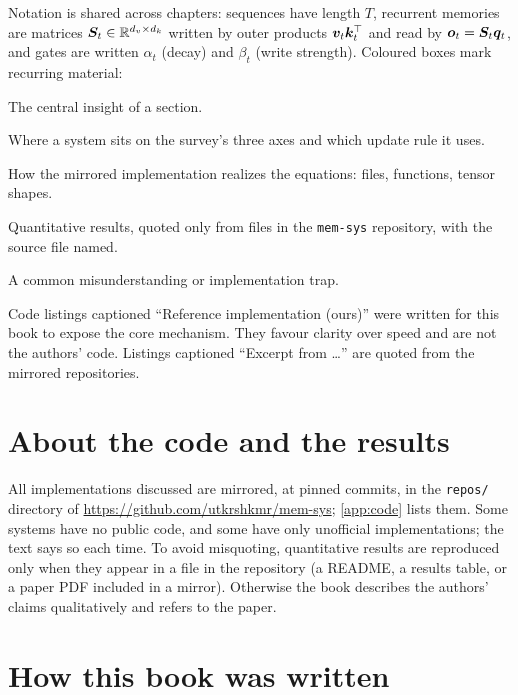 Notation is shared across chapters: sequences have length $T$, recurrent memories are
matrices $\bm{S}_t \in \mathbb{R}^{d_v \times d_k}$ written by outer products $\bm{v}_t\bm{k}_t^{\top}$ and read by
$\bm{o}_t = \bm{S}_t\bm{q}_t$, and gates are written $\alpha_t$ (decay) and $\beta_t$ (write strength).
Coloured boxes mark recurring material:
\begin{keyidea}[title={Key idea}]
The central insight of a section.
\end{keyidea}
\begin{taxonomy}
Where a system sits on the survey's three axes and which update rule it uses.
\end{taxonomy}
\begin{implnote}
How the mirrored implementation realizes the equations: files, functions, tensor shapes.
\end{implnote}
\begin{results}
Quantitative results, quoted only from files in the \texttt{mem-sys} repository, with the
source file named.
\end{results}
\begin{pitfall}
A common misunderstanding or implementation trap.
\end{pitfall}
Code listings captioned ``Reference implementation (ours)'' were written for this book to
expose the core mechanism. They favour clarity over speed and are not the authors' code.
Listings captioned ``Excerpt from \ldots'' are quoted from the mirrored repositories.

\section*{About the code and the results}

All implementations discussed are mirrored, at pinned commits, in the \texttt{repos/}
directory of \url{https://github.com/utkrshkmr/mem-sys}; \cref{app:code} lists them. Some
systems have no public code, and some have only unofficial implementations; the text says so
each time. To avoid misquoting, quantitative results are reproduced only when they appear in
a file in the repository (a README, a results table, or a paper PDF included in a mirror).
Otherwise the book describes the authors' claims qualitatively and refers to the paper.

\section*{How this book was written}

